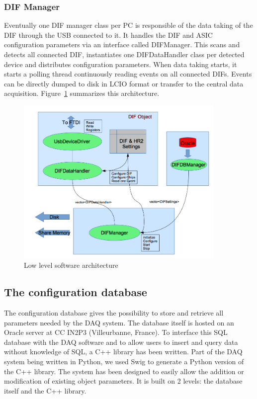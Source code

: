 \documentclass[english]{article}
\begin{document}
\subsubsection{DIF Manager}
\label{sec:DIFManager}

Eventually one DIF manager class per PC is responsible of the data
taking of the DIF through the USB connected to it. It handles the DIF and ASIC
configuration parameters via an interface called  DIFManager. This scans and
detects all connected DIF, instantiates one DIFDataHandler class per detected
device and distributes configuration parameters. %
When data taking starts, it starts a polling thread continuously
reading events on all connected DIFs. Events can be directly dumped
to disk in LCIO format or transfer to the central data acquisition.
Figure~\ref{software_archi} summarizes this architecture.

\begin{figure}
\includegraphics[width=0.9\textwidth]{./LowLevelHardware.png}

\caption{Low level software architecture}
\label{software_archi}

\end{figure}


\subsection{The configuration database}

The configuration database gives the possibility to store and retrieve
all parameters needed by the DAQ system. The database itself is hosted
on an Oracle server at CC IN2P3 (Villeurbanne, France). To interface
this SQL database with the DAQ software and to allow users to insert
and query data without knowledge of SQL, a C++ library has been written.
Part of the DAQ system being written in Python, we used Swig to generate
a Python version of the C++ library. The system has been designed
to easily allow the addition or modification of existing object parameters.
It is built on 2 levels: the database itself and the C++ library.
\end{document}
